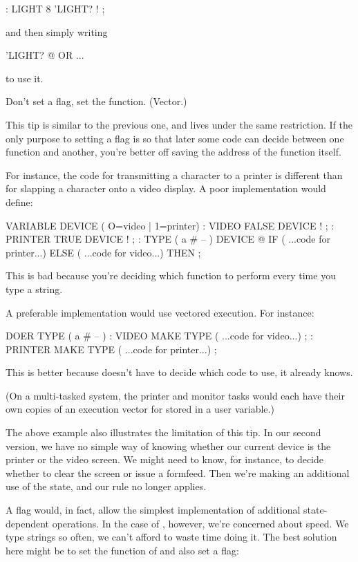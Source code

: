 \begin{Code}
: LIGHT   8 'LIGHT? ! ;
\end{Code}
and then simply writing

\begin{Code}
'LIGHT? @  OR ...
\end{Code}
to use it.

\begin{tip}
Don't set a flag, set the function. (Vector.)
\end{tip}
This tip is similar to the previous one, and lives under the same
restriction. If the only purpose to setting a flag is so that later some
code can decide between one function and another, you're better off saving
the address of the function itself.

For instance, the code for transmitting a character to a printer is
different than for slapping a character onto a video display. A poor
implementation would define:

\begin{Code}
VARIABLE DEVICE  ( O=video | 1=printer)
: VIDEO   FALSE DEVICE ! ;
: PRINTER   TRUE DEVICE ! ;
: TYPE  ( a # -- ) DEVICE @ IF
   ( ...code for printer...) ELSE
   ( ...code for video...)  THEN ;
\end{Code}
This is bad because you're deciding which function to perform every time
you type a string.

A preferable implementation would use vectored execution. For
instance:

\begin{Code}
DOER TYPE  ( a # -- )
: VIDEO   MAKE TYPE ( ...code for video...) ;
: PRINTER   MAKE TYPE ( ...code for printer...) ;
\end{Code}
This is better because  doesn't have to decide which code to
use, it already knows.

(On a multi-tasked system, the printer and monitor tasks would
each have their own copies of an execution vector for 
stored in a user variable.)

The above example also illustrates the limitation of this tip. In our
second version, we have no simple way of knowing whether our current
device is the printer or the video screen. We might need to know, for
instance, to decide whether to clear the screen or issue a formfeed. Then
we're making an additional use of the state, and our rule no longer
applies.

A flag would, in fact, allow the simplest implementation of additional
state-dependent operations. In the case of , however, we're
concerned about speed. We type strings so often, we can't afford to waste
time doing it. The best solution here might be to set the function of
 and also set a flag:

